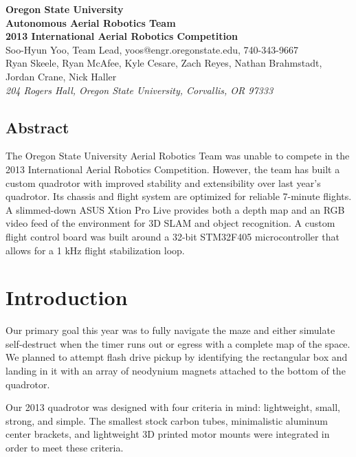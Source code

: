 \documentclass[12pt,letterpaper]{article} \usepackage[margin=1in]{geometry}
\begin{document}
\begin{center}
	{\bf\Large Oregon State University \\
		Autonomous Aerial Robotics Team \\
		2013 International Aerial Robotics Competition \\ [1em]
	}
	{\footnotesize Soo-Hyun Yoo, Team Lead, yoos@engr.oregonstate.edu, 740-343-9667 \\
		Ryan Skeele, Ryan McAfee, Kyle Cesare, Zach Reyes, Nathan Brahmstadt, Jordan Crane, Nick Haller \\ [0.5em]
		\emph{204 Rogers Hall, Oregon State University, Corvallis, OR 97333}
	}
\end{center}


\begin{center} \begin{minipage}{5.5in}

\section*{Abstract}

The Oregon State University Aerial Robotics Team was unable to compete in the
2013 International Aerial Robotics Competition. However, the team has built
a custom quadrotor with improved stability and extensibility over last year's
quadrotor. Its chassis and flight system are optimized for reliable 7-minute
flights. A slimmed-down ASUS Xtion Pro Live provides both a depth map and an
RGB video feed of the environment for 3D SLAM and object recognition. A custom
flight control board was built around a 32-bit STM32F405 microcontroller that
allows for a 1 kHz flight stabilization loop.

\end{minipage} \end{center}



\section*{Introduction}

Our primary goal this year was to fully navigate the maze and either simulate
self-destruct when the timer runs out or egress with a complete map of the
space. We planned to attempt flash drive pickup by identifying the rectangular
box and landing in it with an array of neodynium magnets attached to the bottom
of the quadrotor.

Our 2013 quadrotor was designed with four criteria in mind: lightweight, small,
strong, and simple. The smallest stock carbon tubes, minimalistic aluminum
center brackets, and lightweight 3D printed motor mounts were integrated in
order to meet these criteria.
\end{document}
